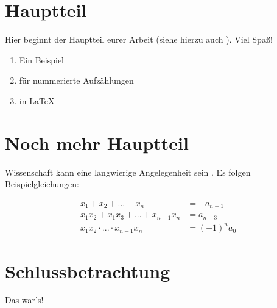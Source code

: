 \documentclass[
sansserifheadings, %
acrosingle, %
]{politikunibremen}
\begin{document}
\blindtext
  
\section{Hauptteil}

Hier beginnt der Hauptteil eurer Arbeit (siehe hierzu auch \citealt{Grimberg.2012}). Viel Spaß!

\begin{enumerate}
\item Ein Beispiel
\item für nummerierte Aufzählungen
\item in \ac{LaTeX}
\end{enumerate}

\blindtext

\section{Noch mehr Hauptteil}

Wissenschaft kann eine langwierige Angelegenheit sein \citep[543ff]{Moriarty.2011}. Es folgen Beispielgleichungen: 

\begin{align} 
x_1+x_2+...+x_n &= -a_{n-1} \label{Summe} \\ 
x_1x_2+x_1x_3+...+x_{n-1}x_n &= a_{n-3}\\ 
x_1x_2 \cdot ... \cdot x_{n-1}x_n &= (-1)^na_0 
\end{align} 

\blindtext

\section{Schlussbetrachtung}

\Blindtext

Das war's!


      
\Literaturverzeichnis %
  
\Tabellenverzeichnis %
  
\Abbildungsverzeichnis %

\Stichwortverzeichnis %
\end{document}
